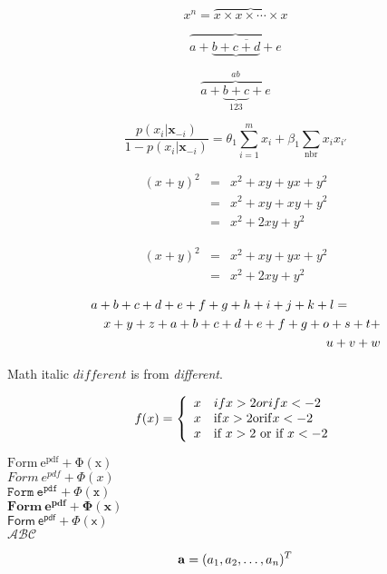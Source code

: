 \documentclass[11pt]{article}
\newcommand{\sumnbr}{\sum_{\mbox{nbr}}}
\begin{document}
$$x^n = \overbrace{x \times x \times \cdots \times x}$$

$$\overbrace{a+\underbrace{b+\overline{c+d}}+e}$$

$$\overbrace{a+\underbrace{b+c}_{123}+e}^{ab}$$

\begin{equation} \label{eq:logodds}
\frac{p(x_i|\bm{x}_{-i})}{1-p(x_i|\bm{x}_{-i})} = 
\theta_1 \sum_{i=1}^m x_i + \beta_1 \sumnbr x_ix_{i'}
\end{equation}

\begin{eqnarray}
(x+y)^2 & = & x^2 + xy + yx + y^2 \label{eqnarray1} \\
		& = & x^2 + xy + xy + y^2 \nonumber \\
		& = & x^2 + 2xy + y^2 \label{eqnarray2}
\end{eqnarray}

\begin{eqnarray}
(x+y)^2 & = & x^2 + xy + yx + y^2 \\
		& = & x^2 + 2xy + y^2 \nonumber
\end{eqnarray}

\begin{eqnarray*}
\lefteqn{a+b+c+d+e+f+g+h+i+j+k+l=}  \\
& & x+y+z+a+b+c+d+e+f+g+o+s+t+ \\
& & u+v+w
\end{eqnarray*}

Math italic $different$ is from \emph{different}.

\begin{equation}
f(x) = \left\{ \begin{array}{rl}
x & if x > 2 or if x < -2 \\
x & {\rm if } x > 2 {\rm or if} x < -2 \\
x & \mbox{if } x > 2 \mbox{ or if } x < -2
\end{array}
\right.
\end{equation}

$\mathrm{Form\ e^{pdf} + \Phi(x)}$ \\
$\mathit{Form\ e^{pdf} + \Phi(x)}$ \\
$\mathtt{Form\ e^{pdf} + \Phi(x)}$ \\
$\mathbf{Form\ e^{pdf} + \Phi(x)}$ \\
$\mathsf{Form\ e^{pdf} + \Phi(x)}$ \\
$\mathcal{ABC}$

$${\bf a} = (a_1, a_2, \ldots, a_n)^T$$
\end{document}
